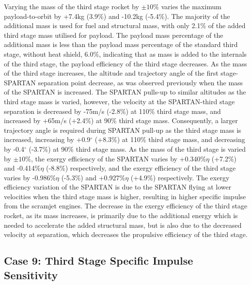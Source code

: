 Varying the mass of the third stage rocket by $\pm10\%$ varies the maximum payload-to-orbit by +7.4kg (3.9\%) and -10.2kg (-5.4\%). 
The majority of the additional mass is used for fuel and structural mass, with only 2.1\% of the added third stage mass utilised for payload. The payload mass percentage of the additional mass is less than the payload mass percentage of the standard third stage, without heat shield, 6.0\%, indicating that as mass is added to the internals of the third stage, the payload efficiency of the third stage decreases.
 As the mass of the third stage increases, the altitude and trajectory angle of the first stage-SPARTAN separation point decrease, as was observed previously when the mass of the SPARTAN is increased. 
 The SPARTAN pulls-up to similar altitudes as the third stage mass is varied, however, the velocity at the SPARTAN-third stage separation is decreased by -75m/s (-2.8\%) at 110\% third stage mass, and increased by +65m/s (+2.4\%) at 90\% third stage mass. 
 Consequently, a larger trajectory angle is required during SPARTAN pull-up as the third stage mass is increased, increasing by +0.9$^\circ$ (+8.3\%) at 110\% third stage mass, and decreasing by -0.4$^\circ$ (-3.7\%) at 90\% third stage mass. 
As the mass of the third stage is varied by $\pm10\%$, the exergy efficiency of the SPARTAN varies by +0.340\%$\eta$ (+7.2\%) and -0.414\%$\eta$ (-8.8\%) respectively, and the exergy efficiency of the third stage varies by -0.986\%$\eta$ (-5.3\%) and +0.927\%$\eta$ (+4.9\%) respectively. The exergy efficiency variation of the SPARTAN is due to the SPARTAN flying at lower velocities when the third stage mass is higher, resulting in higher specific impulse from the scramjet engines. 
The decrease in the exergy efficiency of the third stage rocket, as its mass increases, is primarily due to the additional energy which is needed to accelerate the added structural mass, but is also due to the decreased velocity at separation, which decreases the propulsive efficiency of the third stage. 



\subsection{Case 9: Third Stage Specific Impulse Sensitivity}\label{sec:isp3NoReturn}

